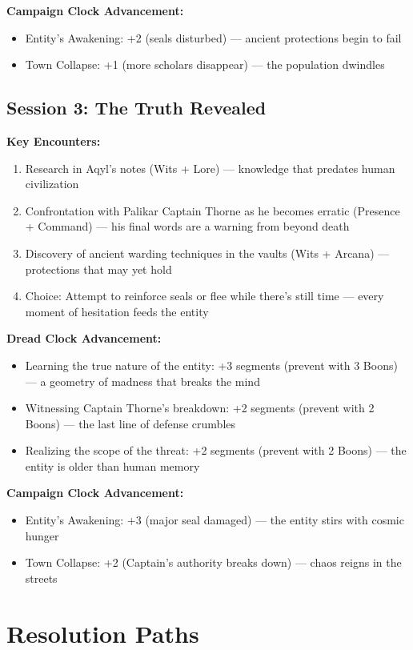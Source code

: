 \documentclass[11pt]{article}
\begin{document}
\textbf{Campaign Clock Advancement:}
\begin{itemize}
\item Entity's Awakening: +2 (seals disturbed) — ancient protections begin to fail
\item Town Collapse: +1 (more scholars disappear) — the population dwindles
\end{itemize}

\subsection{Session 3: The Truth Revealed}

\textbf{Key Encounters:}
\begin{enumerate}
\item Research in Aqyl's notes (Wits + Lore) — knowledge that predates human civilization
\item Confrontation with Palikar Captain Thorne as he becomes erratic (Presence + Command) — his final words are a warning from beyond death
\item Discovery of ancient warding techniques in the vaults (Wits + Arcana) — protections that may yet hold
\item Choice: Attempt to reinforce seals or flee while there's still time — every moment of hesitation feeds the entity
\end{enumerate}

\textbf{Dread Clock Advancement:}
\begin{itemize}
\item Learning the true nature of the entity: +3 segments (prevent with 3 Boons) — a geometry of madness that breaks the mind
\item Witnessing Captain Thorne's breakdown: +2 segments (prevent with 2 Boons) — the last line of defense crumbles
\item Realizing the scope of the threat: +2 segments (prevent with 2 Boons) — the entity is older than human memory
\end{itemize}

\textbf{Campaign Clock Advancement:}
\begin{itemize}
\item Entity's Awakening: +3 (major seal damaged) — the entity stirs with cosmic hunger
\item Town Collapse: +2 (Captain's authority breaks down) — chaos reigns in the streets
\end{itemize}

\section{Resolution Paths}
\end{document}
